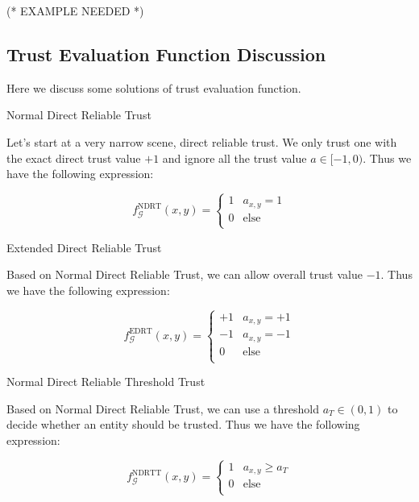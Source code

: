 \documentclass{article}
\begin{document}
(* EXAMPLE NEEDED *)


\subsection{Trust Evaluation Function Discussion}

Here we discuss some solutions of trust evaluation function.

Normal Direct Reliable Trust

Let{'}s start at a very narrow scene, direct reliable trust. We only trust one with the exact direct trust value \(+1\) and ignore all the trust
value \(a\in [-1,0)\). Thus we have the following expression:

\begin{equation}
f_{\mathcal{G}}^{\text{NDRT}}(x,y)=\left\{
\begin{array}{cc}
 1 & a_{x,y}=1 \\
 0 & \text{else} \\
\end{array}
\right.
\end{equation}

Extended Direct Reliable Trust

Based on Normal Direct Reliable Trust, we can allow overall trust value \(-1\). Thus we have the following expression:

\begin{equation}
f_{\mathcal{G}}^{\text{EDRT}}(x,y)=\left\{
\begin{array}{cc}
 +1 & a_{x,y}=+1 \\
 -1 & a_{x,y}=-1 \\
 0 & \text{else} \\
\end{array}
\right.
\end{equation}

Normal Direct Reliable Threshold Trust

Based on Normal Direct Reliable Trust, we can use a threshold \(a_T\in (0,1)\) to decide whether an entity should be trusted. Thus we have the following
expression:

\begin{equation}
f_{\mathcal{G}}^{\text{NDRTT}}(x,y)=\left\{
\begin{array}{cc}
 1 & a_{x,y}\geq a_T \\
 0 & \text{else} \\
\end{array}
\right.
\end{equation}
\end{document}
